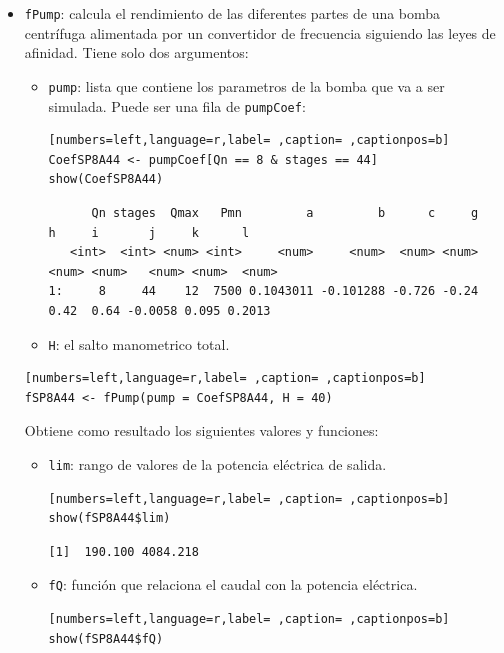 \begin{itemize}
\item \texttt{fPump}: calcula el rendimiento de las diferentes partes de una bomba centrífuga alimentada por un convertidor de frecuencia siguiendo las leyes de afinidad. Tiene solo dos argumentos:
\begin{itemize}
\item \texttt{pump}: lista que contiene los parametros de la bomba que va a ser simulada. Puede ser una fila de \texttt{pumpCoef}:
\begin{lstlisting}[numbers=left,language=r,label= ,caption= ,captionpos=b]
CoefSP8A44 <- pumpCoef[Qn == 8 & stages == 44]
show(CoefSP8A44)
\end{lstlisting}

\begin{verbatim}
      Qn stages  Qmax   Pmn         a         b      c     g     h     i       j     k      l
   <int>  <int> <num> <int>     <num>     <num>  <num> <num> <num> <num>   <num> <num>  <num>
1:     8     44    12  7500 0.1043011 -0.101288 -0.726 -0.24  0.42  0.64 -0.0058 0.095 0.2013
\end{verbatim}

\item \texttt{H}: el salto manometrico total.
\end{itemize}
\begin{lstlisting}[numbers=left,language=r,label= ,caption= ,captionpos=b]
fSP8A44 <- fPump(pump = CoefSP8A44, H = 40)
\end{lstlisting}

Obtiene como resultado los siguientes valores y funciones:
\begin{itemize}
\item \texttt{lim}: rango de valores de la potencia eléctrica de salida.
\begin{lstlisting}[numbers=left,language=r,label= ,caption= ,captionpos=b]
show(fSP8A44$lim)
\end{lstlisting}

\begin{verbatim}
[1]  190.100 4084.218
\end{verbatim}

\item \texttt{fQ}: función que relaciona el caudal con la potencia eléctrica.
\begin{lstlisting}[numbers=left,language=r,label= ,caption= ,captionpos=b]
show(fSP8A44$fQ)
\end{lstlisting}


\end{itemize}
\end{itemize}
